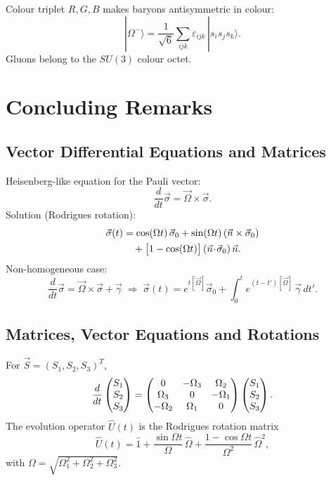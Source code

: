 Colour triplet $R,G,B$ makes baryons antisymmetric in colour:
\[
|\Omega^{-}\rangle = \frac{1}{\sqrt{6}}\sum_{ijk}\varepsilon_{ijk}\,|s_{i}s_{j}s_{k}\rangle.
\]
Gluons belong to the $SU(3)$ colour octet.

\section{Concluding Remarks}
\label{sec:1.6}

\subsection{Vector Differential Equations and Matrices}
\label{sec:1.6.1}

Heisenberg-like equation for the Pauli vector:
\[
\frac{d}{dt}\vec{\sigma} = \vec{\Omega}\times\vec{\sigma}.
\]
Solution (Rodrigues rotation):
\begin{align}
\vec{\sigma}(t)
&= \cos(\Omega t)\,\vec{\sigma}_{0}
 + \sin(\Omega t)\,(\vec{n}\times\vec{\sigma}_{0}) \notag \\
&\quad + \bigl[1-\cos(\Omega t)\bigr]\,(\vec{n}\!\cdot\!\vec{\sigma}_{0})\,\vec{n}.
\label{eq:rodrigues}
\end{align}
Non-homogeneous case:
\[
\frac{d}{dt}\vec{\sigma} = \vec{\Omega}\times\vec{\sigma} + \vec{\gamma}
\;\Longrightarrow\;
\vec{\sigma}(t) = e^{t[\vec{\Omega}]}\vec{\sigma}_{0}
+ \int_{0}^{t} e^{(t-t')[\vec{\Omega}]}\,\vec{\gamma}\,dt'.
\]

\subsection{Matrices, Vector Equations and Rotations}
\label{sec:1.6.2}

For $\vec{S} = (S_{1},S_{2},S_{3})^{T}$,
\[
\frac{d}{dt}\begin{pmatrix}S_{1}\\S_{2}\\S_{3}\end{pmatrix}
= \begin{pmatrix}0&-\Omega_{3}&\Omega_{2}\\
        \Omega_{3}&0&-\Omega_{1}\\
       -\Omega_{2}&\Omega_{1}&0\end{pmatrix}
  \begin{pmatrix}S_{1}\\S_{2}\\S_{3}\end{pmatrix}.
\]
The evolution operator $\hat{U}(t)$ is the Rodrigues rotation matrix
\[
\hat{U}(t) = \hat{1} + \frac{\sin\Omega t}{\Omega}\,\hat{\Omega}
+ \frac{1-\cos\Omega t}{\Omega^{2}}\,\hat{\Omega}^{2},
\]
with $\Omega = \sqrt{\Omega_{1}^{2}+\Omega_{2}^{2}+\Omega_{3}^{2}}$.

